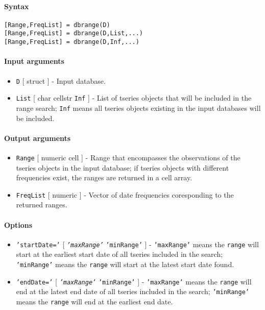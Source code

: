


	\paragraph{Syntax}\label{syntax}

\begin{verbatim}
[Range,FreqList] = dbrange(D)
[Range,FreqList] = dbrange(D,List,...)
[Range,FreqList] = dbrange(D,Inf,...)
\end{verbatim}

\paragraph{Input arguments}\label{input-arguments}

\begin{itemize}
\item
  \texttt{D} {[} struct {]} - Input database.
\item
  \texttt{List} {[} char \textbar{} cellstr \textbar{} \texttt{Inf} {]}
  - List of tseries objects that will be included in the range search;
  \texttt{Inf} means all tseries objects existing in the input databases
  will be included.
\end{itemize}

\paragraph{Output arguments}\label{output-arguments}

\begin{itemize}
\item
  \texttt{Range} {[} numeric \textbar{} cell {]} - Range that
  encompasses the observations of the tseries objects in the input
  database; if tseries objects with different frequencies exist, the
  ranges are returned in a cell array.
\item
  \texttt{FreqList} {[} numeric {]} - Vector of date frequencies
  coresponding to the returned ranges.
\end{itemize}

\paragraph{Options}\label{options}

\begin{itemize}
\item
  \texttt{'startDate='} {[} \emph{\texttt{'maxRange'}} \textbar{}
  \texttt{'minRange'} {]} - \texttt{'maxRange'} means the \texttt{range}
  will start at the earliest start date of all tseries included in the
  search; \texttt{'minRange'} means the \texttt{range} will start at the
  latest start date found.
\item
  \texttt{'endDate='} {[} \emph{\texttt{'maxRange'}} \textbar{}
  \texttt{'minRange'} {]} - \texttt{'maxRange'} means the \texttt{range}
  will end at the latest end date of all tseries included in the search;
  \texttt{'minRange'} means the \texttt{range} will end at the earliest
  end date.
\end{itemize}

